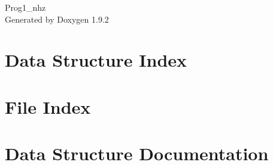 \documentclass[twoside]{book}
\newcommand{\+}{\discretionary{\mbox{\scriptsize$\hookleftarrow$}}{}{}}
\newcommand{\clearemptydoublepage}{%
    \newpage{\pagestyle{empty}\cleardoublepage}%
  }
\begin{document}
  \raggedbottom
    \hypersetup{pageanchor=false,
                bookmarksnumbered=true,
                pdfencoding=unicode
               }
  \begin{titlepage}
  \vspace*{7cm}
  \begin{center}%
  {\Large Prog1\+\_\+nhz}\\
  \vspace*{1cm}
  {\large Generated by Doxygen 1.9.2}\\
  \end{center}
  \end{titlepage}
  \clearemptydoublepage
  \tableofcontents
  \clearemptydoublepage
  \hypersetup{pageanchor=true}
\chapter{Data Structure Index}

\chapter{File Index}

\chapter{Data Structure Documentation}



































\end{document}
